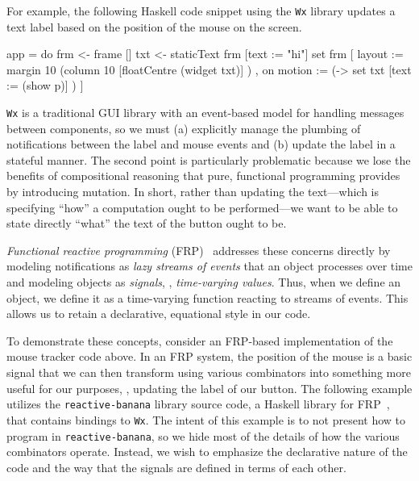 For example, the following Haskell code snippet using the \texttt{Wx} library updates a text label  based on the position of the mouse on the screen.
\begin{center}
\begin{minipage}{0.9\textwidth}
\begin{haskellcode}
app =
  do frm <- frame []
     txt <- staticText frm [text := "hi"]
     set frm [ layout := margin 10 (column 10 [floatCentre (widget txt)] )
             , on motion := (\p -> set txt [text := (show p)] ) ]
\end{haskellcode}
\end{minipage}
\end{center}
\texttt{Wx} is a traditional GUI library with an event-based model for handling messages between components, so we must (a) explicitly manage the plumbing of notifications between the label and mouse events and (b) update the label in a stateful manner.
The second point is particularly problematic because we lose the benefits of compositional reasoning that pure, functional programming provides by introducing mutation.
In short, rather than updating the text---which is specifying ``how'' a computation ought to be performed---we want to be able to state directly ``what'' the text of the button ought to be.

\emph{Functional reactive programming} (FRP)~\cite{elliott1997, czaplicki2013, finkbeiner2019, jeffrey2012} addresses these concerns directly by modeling notifications as \emph{lazy streams of events} that an object processes over time and modeling objects as \emph{signals}, \ie, \emph{time-varying values}.
Thus, when we define an object, we define it as a time-varying function reacting to streams of events.
This allows us to retain a declarative, equational style in our code.

To demonstrate these concepts, consider an FRP-based implementation of the mouse tracker code above.
In an FRP system, the position of the mouse is a basic signal that we can then transform using various combinators into something more useful for our purposes, \eg, updating the label of our button.
The following example utilizes the \texttt{reactive-banana} library source code, a Haskell library for FRP~\cite{reactive-banana}, that contains bindings to \texttt{Wx}.
The intent of this example is to not present how to program in \texttt{reactive-banana}, so we hide most of the details of how the various combinators operate.
Instead, we wish to emphasize the declarative nature of the code and the way that the signals are defined in terms of each other.

